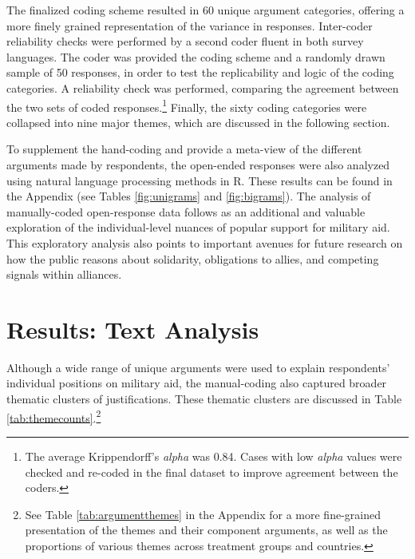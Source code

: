 The finalized coding scheme resulted in 60 unique argument categories, offering a more finely grained representation of the variance in responses. Inter-coder reliability checks were performed by a second coder fluent in both survey languages. The coder was provided the coding scheme and a randomly drawn sample of 50 responses, in order to test the replicability and logic of the coding categories. A reliability check was performed, comparing the agreement between the two sets of coded responses.\footnote{The average Krippendorff's \textit{alpha} was 0.84. Cases with low \textit{alpha} values were checked and re-coded in the final dataset to improve agreement between the coders.} Finally, the sixty coding categories were collapsed into nine major themes, which are discussed in the following section. 

To supplement the hand-coding and provide a meta-view of the different arguments made by respondents, the open-ended responses were also analyzed using natural language processing methods in R. These results can be found in the Appendix (see Tables \ref{fig:unigrams} and \ref{fig:bigrams}). The analysis of manually-coded open-response data follows as an additional and valuable exploration of the individual-level nuances of popular support for military aid. This exploratory analysis also points to important avenues for future research on how the public reasons about solidarity, obligations to allies, and competing signals within alliances.  

\section{Results: Text Analysis} 
Although a wide range of unique arguments were used to explain respondents' individual positions on military aid, the manual-coding also captured broader thematic clusters of justifications. These thematic clusters are discussed in Table \ref{tab:themecounts}.\footnote{See Table \ref{tab:argumentthemes} in the Appendix for a more fine-grained presentation of the themes and their component arguments, as well as the proportions of various themes across treatment groups and countries.} 

